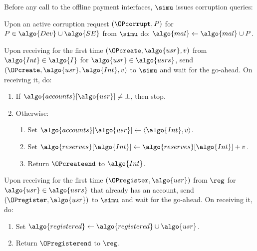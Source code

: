 \begingroup
    \begin{framed}


	Before any call to the offline payment interfaces, $\simu$ issues
corruption queries:

	\fuinterface{\OPcorrupt} Upon an active corruption request $(\OPcorrupt, P)$ for
$P \in \algo{Dev} \cup \algo{SE}$ from $\simu$ do: $\algo{mal} \gets \algo{mal}
\cup P$.

	\fuinterface{\OPcreate} Upon receiving for the first time $(\OPcreate,
\algo{usr}, v)$ from $\algo{Int} \in \algo{I}$ for $\algo{usr} \in \algo{usrs}$,
send $(\OPcreate, \algo{usr}, \algo{Int}, v)$ to $\simu$ and wait for the
go-ahead. On receiving it, do:

	\begin{enumerate}

	  \item If $\algo{accounts}[\algo{usr}] \neq \bot$, then stop.

	  \item Otherwise:

	    \begin{enumerate}

	      \item Set $\algo{accounts}[\algo{usr}] \leftarrow \langle
\algo{Int}, v\rangle$.

	      \item Set $\algo{reserves}[\algo{Int}] \leftarrow
\algo{reserves}[\algo{Int}]+v$.

	      \item Return $\OPcreateend$ to $\algo{Int}$.

	    \end{enumerate}

	\end{enumerate}

	\fuinterface{\OPregister} Upon receiving for the first time $(\OPregister,
\algo{usr})$ from $\reg$ for $\algo{usr} \in \algo{usrs}$ that already has an
account, send $(\OPregister, \algo{usr})$ to $\simu$ and wait for the go-ahead.
On receiving it, do:

	\begin{enumerate}

	  \item Set $\algo{registered} \gets \algo{registered} \cup \algo{usr}$.

	  \item Return $\OPregisterend$ to $\reg$.


\end{enumerate}
\end{framed}
